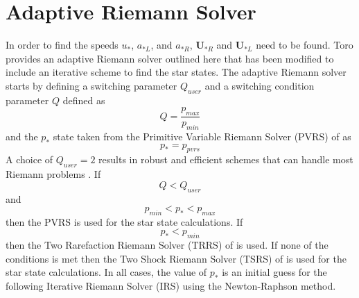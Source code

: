 \section{Adaptive Riemann Solver}\label{sect:AdaptiveRiemannSolver}

In order to find the speeds $u_*$, $a_{*L}$, and $a_{*R}$, $\boldsymbol{U}_{*R}$ and $\boldsymbol{U}_{*L}$ need to be found. Toro \cite{toro2013riemann} provides an adaptive Riemann solver outlined here that has been modified to include an iterative scheme to find the star states. The adaptive Riemann solver starts by defining a switching parameter $Q_{user}$ and a switching condition parameter $Q$ defined as
\begin{equation}
	Q = \frac{p_{max}}{p_{min}}
\end{equation}
and the $p_*$ state taken from the Primitive Variable Riemann Solver (PVRS) of  as
\begin{equation}
	p_* = p_{pvrs}
\end{equation}
A choice of $Q_{user} = 2$ results in robust and efficient schemes that can handle most Riemann problems \cite{toro2013riemann}. If
\begin{equation}
	Q < Q_{user}
\end{equation}
and
\begin{equation}
	p_{min} < p_* < p_{max}
\end{equation}
then the PVRS is used for the star state calculations. If
\begin{equation}
	p_* < p_{min}
\end{equation}
then the Two Rarefaction Riemann Solver (TRRS) of  is used. If none of the conditions is met then the Two Shock Riemann Solver (TSRS) of  is used for the star state calculations. In all cases, the value of $p_*$ is an initial guess for the following Iterative Riemann Solver (IRS) using the Newton-Raphson method.

